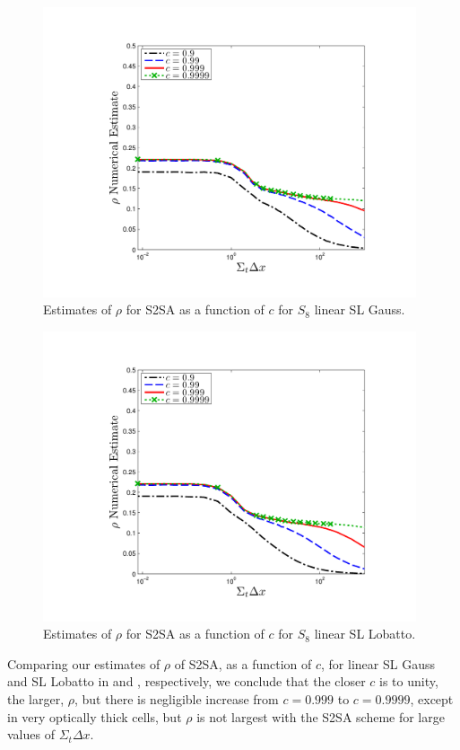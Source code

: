 %
%
\begin{figure}[!hbp]
\centering
\includegraphics[width=11cm]{chapter4_acceleration/Constant_XS_c_comparions_S2SA_Gauss.pdf}
\caption{Estimates of $\rho$ for S2SA as a function of $c$  for  $S_8$  linear SL Gauss.}
\label{fig:s2sa_gauss_as_fun_c}
\end{figure}
%
%
\begin{figure}[!htp]
\centering
\includegraphics[width=11cm]{chapter4_acceleration/Constant_XS_c_comparions_S2SA_Lobatto.pdf}
\caption{Estimates of $\rho$ for S2SA as a function of $c$  for  $S_8$  linear SL Lobatto.}
\label{fig:s2sa_lobatto_as_fun_c}
\end{figure}
%
%
Comparing our estimates of $\rho$ of S2SA, as a function of $c$, for linear SL Gauss and SL Lobatto in  and , respectively, we  conclude that the closer $c$ is to unity, the larger, $\rho$, but there is negligible increase from $c=0.999$ to $c=0.9999$, except in very optically thick cells, but $\rho$ is not largest with the S2SA scheme for large values of $\Sigma_t \Delta x$.  
